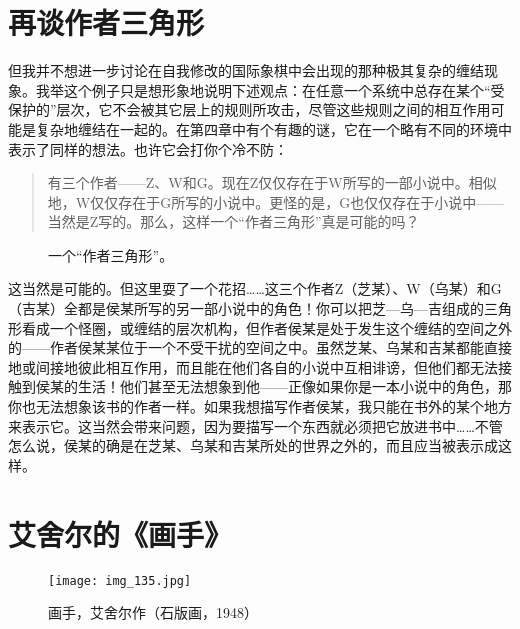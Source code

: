 \section{再谈作者三角形}

但我并不想进一步讨论在自我修改的国际象棋中会出现的那种极其复杂的缠结现象。我举这个例子只是想形象地说明下述观点：在任意一个系统中总存在某个“受保护的”层次，它不会被其它层上的规则所攻击，尽管这些规则之间的相互作用可能是复杂地缠结在一起的。在第四章中有个有趣的谜，它在一个略有不同的环境中表示了同样的想法。也许它会打你个冷不防：

\begin{quote}
有三个作者——Z、W和G。现在Z仅仅存在于W所写的一部小说中。相似地，W仅仅存在于G所写的小说中。更怪的是，G也仅仅存在于小说中——当然是Z写的。那么，这样一个“作者三角形”真是可能的吗？
\end{quote}

\begin{figure}
\caption[一个作者三角形。]
  {一个“作者三角形”。}
\end{figure}

这当然是可能的。但这里耍了一个花招……这三个作者Z（芝某）、W（乌某）和G（吉某）全都是侯某所写的另一部小说中的角色！你可以把芝—乌—吉组成的三角形看成一个怪圈，或缠结的层次机构，但作者侯某是处于发生这个缠结的空间之外的——作者侯某某位于一个不受干扰的空间之中。虽然芝某、乌某和吉某都能直接地或间接地彼此相互作用，而且能在他们各自的小说中互相诽谤，但他们都无法接触到侯某的生活！他们甚至无法想象到他——正像如果你是一本小说中的角色，那你也无法想象该书的作者一样。如果我想描写作者侯某，我只能在书外的某个地方来表示它。这当然会带来问题，因为要描写一个东西就必须把它放进书中……不管怎么说，侯某的确是在芝某、乌某和吉某所处的世界之外的，而且应当被表示成这样。

\section{艾舍尔的《画手》}

\begin{figure}
\texttt{[image: img\_135.jpg]}
\caption[画手，艾舍尔作。]
  {画手，艾舍尔作（石版画，1948）}
\end{figure}

